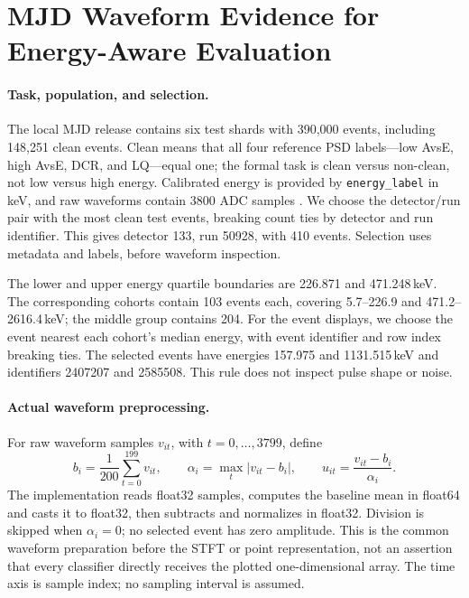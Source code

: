 \section{MJD Waveform Evidence for Energy-Aware Evaluation}
\label{app:mjd-motivation}

\paragraph{Task, population, and selection.}
The local MJD release contains six test shards with 390,000 events,
including 148,251 clean events. Clean means that all four reference PSD
labels---low AvsE, high AvsE, DCR, and LQ---equal one; the formal task is
clean versus non-clean, not low versus high energy. Calibrated energy is
provided by \texttt{energy\_label} in keV, and raw waveforms contain 3800
ADC samples \citep{arnquist2023mjdrelease}. We choose the detector/run pair
with the most clean test events, breaking count ties by detector and run
identifier. This gives detector 133, run 50928, with 410 events. Selection
uses metadata and labels, before waveform inspection.

The lower and upper energy quartile boundaries are 226.871 and
471.248\,keV. The corresponding cohorts contain 103 events each,
covering 5.7--226.9 and 471.2--2616.4\,keV; the middle group contains 204.
For the event displays, we choose the event nearest each cohort's median
energy, with event identifier and row index breaking ties. The selected
events have energies 157.975 and 1131.515\,keV and identifiers 2407207
and 2585508. This rule does not inspect pulse shape or noise.

\paragraph{Actual waveform preprocessing.}
For raw waveform samples $v_{it}$, with $t=0,\ldots,3799$, define
\begin{equation}
 b_i=\frac{1}{200}\sum_{t=0}^{199}v_{it},\qquad
 \alpha_i=\max_t|v_{it}-b_i|,\qquad
 u_{it}=\frac{v_{it}-b_i}{\alpha_i}.
\end{equation}
The implementation reads float32 samples, computes the baseline mean in
float64 and casts it to float32, then subtracts and normalizes in float32.
Division is skipped when $\alpha_i=0$; no selected event has zero amplitude.
This is the common waveform preparation before the STFT or point
representation, not an assertion that every classifier directly receives
the plotted one-dimensional array. The time axis is sample index; no
sampling interval is assumed.


